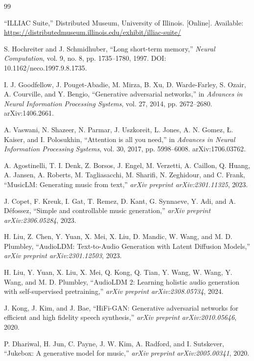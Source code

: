 \documentclass[12pt]{article}
\begin{document}
\footnotesize
\begin{thebibliography}{99}

``ILLIAC Suite,'' Distributed Museum, University of Illinois. [Online]. Available: \url{https://distributedmuseum.illinois.edu/exhibit/illiac-suite/}

S. Hochreiter and J. Schmidhuber, ``Long short-term memory,'' \textit{Neural Computation}, vol. 9, no. 8, pp. 1735--1780, 1997. DOI: 10.1162/neco.1997.9.8.1735.

I. J. Goodfellow, J. Pouget-Abadie, M. Mirza, B. Xu, D. Warde-Farley, S. Ozair, A. Courville, and Y. Bengio, ``Generative adversarial networks,'' in \textit{Advances in Neural Information Processing Systems}, vol. 27, 2014, pp. 2672--2680. arXiv:1406.2661.

A. Vaswani, N. Shazeer, N. Parmar, J. Uszkoreit, L. Jones, A. N. Gomez, Ł. Kaiser, and I. Polosukhin, ``Attention is all you need,'' in \textit{Advances in Neural Information Processing Systems}, vol. 30, 2017, pp. 5998--6008. arXiv:1706.03762.

A. Agostinelli, T. I. Denk, Z. Borsos, J. Engel, M. Verzetti, A. Caillon, Q. Huang, A. Jansen, A. Roberts, M. Tagliasacchi, M. Sharifi, N. Zeghidour, and C. Frank, ``MusicLM: Generating music from text,'' \textit{arXiv preprint arXiv:2301.11325}, 2023.

J. Copet, F. Kreuk, I. Gat, T. Remez, D. Kant, G. Synnaeve, Y. Adi, and A. Défossez, ``Simple and controllable music generation,'' \textit{arXiv preprint arXiv:2306.05284}, 2023.

H. Liu, Z. Chen, Y. Yuan, X. Mei, X. Liu, D. Mandic, W. Wang, and M. D. Plumbley, ``AudioLDM: Text-to-Audio Generation with Latent Diffusion Models,'' \textit{arXiv preprint arXiv:2301.12503}, 2023.

H. Liu, Y. Yuan, X. Liu, X. Mei, Q. Kong, Q. Tian, Y. Wang, W. Wang, Y. Wang, and M. D. Plumbley, ``AudioLDM 2: Learning holistic audio generation with self-supervised pretraining,'' \textit{arXiv preprint arXiv:2308.05734}, 2024.

J. Kong, J. Kim, and J. Bae, ``HiFi-GAN: Generative adversarial networks for efficient and high fidelity speech synthesis,'' \textit{arXiv preprint arXiv:2010.05646}, 2020.

P. Dhariwal, H. Jun, C. Payne, J. W. Kim, A. Radford, and I. Sutskever, ``Jukebox: A generative model for music,'' \textit{arXiv preprint arXiv:2005.00341}, 2020.


\end{thebibliography}
\end{document}
